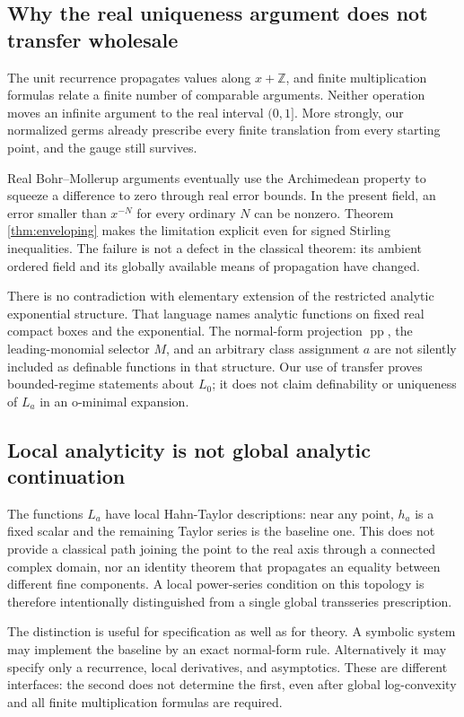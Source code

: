 \documentclass[11pt,letterpaper]{article}
\numberwithin{equation}{section}
\theoremstyle{plain}
\theoremstyle{definition}
\theoremstyle{remark}
\newcommand{\Z}{\mathbb Z}
\newcommand{\pp}{\operatorname{pp}}
\begin{document}
\subsection{Why the real uniqueness argument does not transfer wholesale}
The unit recurrence propagates values along $x+\Z$, and finite
multiplication formulas relate a finite number of comparable arguments.
Neither operation moves an infinite argument to the real interval $(0,1]$.
More strongly, our normalized germs already prescribe every finite
translation from every starting point, and the gauge still survives.

Real Bohr--Mollerup arguments eventually use the Archimedean property to
squeeze a difference to zero through real error bounds. In the present
field, an error smaller than $x^{-N}$ for every ordinary $N$ can be nonzero.
Theorem \ref{thm:enveloping} makes the limitation explicit even for signed
Stirling inequalities. The failure is not a defect in the classical theorem:
its ambient ordered field and its globally available means of propagation
have changed.

There is no contradiction with elementary extension of the restricted
analytic exponential structure. That language names analytic functions on
fixed real compact boxes and the exponential. The normal-form projection
$\pp$, the leading-monomial selector $M$, and an arbitrary class assignment
$a$ are not silently included as definable functions in that structure.
Our use of transfer proves bounded-regime statements about $L_0$; it does
not claim definability or uniqueness of $L_a$ in an o-minimal expansion.

\subsection{Local analyticity is not global analytic continuation}
The functions $L_a$ have local Hahn-Taylor descriptions: near any point,
$h_a$ is a fixed scalar and the remaining Taylor series is the baseline one.
This does not provide a classical path joining the point to the real axis
through a connected complex domain, nor an identity theorem that propagates
an equality between different fine components. A local power-series
condition on this topology is therefore intentionally distinguished from a
single global transseries prescription.

The distinction is useful for specification as well as for theory. A
symbolic system may implement the baseline by an exact normal-form rule.
Alternatively it may specify only a recurrence, local derivatives, and
asymptotics. These are different interfaces: the second does not determine
the first, even after global log-convexity and all finite multiplication
formulas are required.
\end{document}
